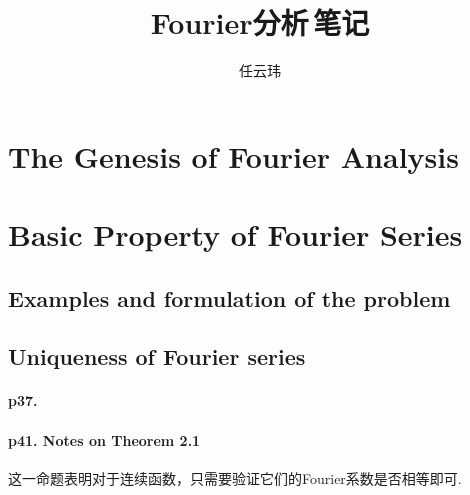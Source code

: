 

\title{Fourier分析$\,$笔记}
\author{任云玮}
\date{}



\maketitle
\tableofcontents

\newpage
\section{The Genesis of Fourier Analysis}

\section{Basic Property of Fourier Series}

\subsection{Examples and formulation of the problem}

\subsection{Uniqueness of Fourier series}
  \paragraph{p37. }

  \paragraph{p41. Notes on Theorem 2.1}
    这一命题表明对于连续函数，只需要验证它们的Fourier系数是否相等即可. 

